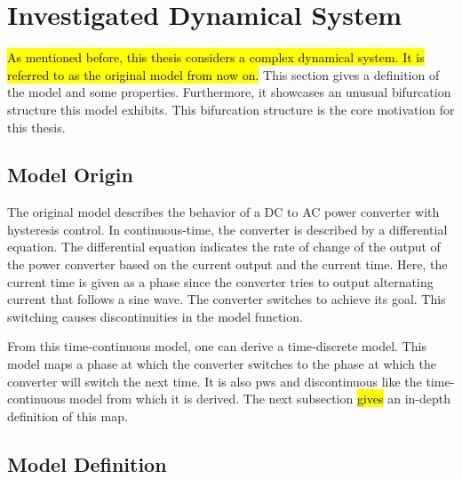 \section{Investigated Dynamical System}
\label{sec:state.og}

\hl{
	As mentioned before, this thesis considers a complex dynamical system.
	It is referred to as the original model from now on.
}
This section gives a definition of the model and some properties.
Furthermore, it showcases an unusual bifurcation structure this model exhibits.
This bifurcation structure is the core motivation for this thesis.

\subsection{Model Origin}
\label{sec:state.og.orig}

The original model describes the behavior of a DC to AC power converter with hysteresis control.
In continuous-time, the converter is described by a differential equation.
The differential equation indicates the rate of change of the output of the power converter based on the current output and the current time.
Here, the current time is given as a phase since the converter tries to output alternating current that follows a sine wave.
The converter switches to achieve its goal.
This switching causes discontinuities in the model function.

From this time-continuous model, one can derive a time-discrete model.
This model maps a phase at which the converter switches to the phase at which the converter will switch the next time.
It is also \gls{pws} and discontinuous like the time-continuous model from which it is derived.
The next subsection \hl{gives} an in-depth definition of this map.

\subsection{Model Definition}
\label{sec:state.og.def}

